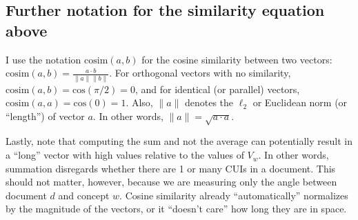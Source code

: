 \documentclass{article}
\begin{document}
\subsection*{Further notation for the similarity equation above}

I use the notation $\mathrm{cosim}(a, b)$ for the cosine similarity between two
vectors: $\mathrm{cosim}(a,b) = \frac{a \cdot b}{\|a\| \|b\|}$. For
orthogonal vectors with no similarity, $\mathrm{cosim}(a,b) =
\mathrm{cos}(\pi / 2) = 0$, and for identical (or parallel) vectors,
$\mathrm{cosim}(a,a) = \mathrm{cos}(0) = 1$. Also, $ \| a \| $ denotes
the $\ell_2$ or Euclidean norm (or ``length'') of vector $a$. In other
words, $ \| a \| = \sqrt{a \cdot a}$.

Lastly, note that computing the sum and not the average can
potentially result in a ``long'' vector with high values relative to
the values of $V_w$. In other words, summation disregards whether
there are 1 or many CUIs in a document. This should not matter,
however, because we are measuring only the angle between document $d$
and concept $w$. Cosine similarity already ``automatically''
normalizes by the magnitude of the vectors, or it ``doesn't care'' how
long they are in space.
\end{document}

